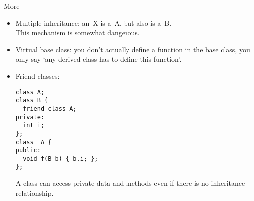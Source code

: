 \begin{block}{More}
  \label{sl:obj-more}  
  \begin{itemize}
  \item  Multiple inheritance: an~X is-a~A, but also is-a~B.\\
    This mechanism is somewhat dangerous.
  \item Virtual base class: you don't actually define a function in
    the base class, you only say `any derived class has to define this
    function'.
  \item Friend classes:
\begin{verbatim}
class A;
class B {
  friend class A;
private:
  int i;
};
class  A {
public: 
  void f(B b) { b.i; };
};
\end{verbatim}
  A  class can access private data and methods
  even if there is no inheritance relationship.
  \end{itemize}
\end{block}

